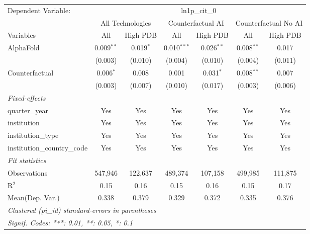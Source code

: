 \begingroup
\centering
\begin{tabular}{lcccccc}
   \tabularnewline \midrule \midrule
   Dependent Variable: & \multicolumn{6}{c}{ln1p\_cit\_0}\\
 & \multicolumn{2}{c}{All Technologies} & \multicolumn{2}{c}{Counterfactual AI} & \multicolumn{2}{c}{Counterfactual No AI} \\
\cmidrule(lr){1-1}\cmidrule(lr){2-3} \cmidrule(lr){4-5} \cmidrule(lr){6-7}
Variables & \multicolumn{1}{c}{All} & \multicolumn{1}{c}{High PDB} & \multicolumn{1}{c}{All} & \multicolumn{1}{c}{High PDB} & \multicolumn{1}{c}{All} & \multicolumn{1}{c}{High PDB} \\
\cmidrule(lr){1-1}\cmidrule(lr){2-2} \cmidrule(lr){3-3} \cmidrule(lr){4-4} \cmidrule(lr){5-5} \cmidrule(lr){6-6} \cmidrule(lr){7-7}
   AlphaFold                    & 0.009$^{**}$ & 0.019$^{*}$ & 0.010$^{***}$ & 0.026$^{**}$ & 0.008$^{**}$ & 0.017\\   
                                & (0.003)      & (0.010)     & (0.004)       & (0.010)      & (0.004)      & (0.011)\\   
   Counterfactual               & 0.006$^{*}$  & 0.008       & 0.001         & 0.031$^{*}$  & 0.008$^{**}$ & 0.007\\   
                                & (0.003)      & (0.007)     & (0.010)       & (0.017)      & (0.003)      & (0.006)\\   
   \midrule
   \emph{Fixed-effects}\\
   quarter\_year                & Yes          & Yes         & Yes           & Yes          & Yes          & Yes\\  
   institution                  & Yes          & Yes         & Yes           & Yes          & Yes          & Yes\\  
   institution\_type            & Yes          & Yes         & Yes           & Yes          & Yes          & Yes\\  
   institution\_country\_code   & Yes          & Yes         & Yes           & Yes          & Yes          & Yes\\  
   \midrule
   \emph{Fit statistics}\\
   Observations                 & 547,946      & 122,637     & 489,374       & 107,158      & 499,985      & 111,875\\  
   R$^2$                        & 0.15         & 0.16        & 0.15          & 0.16         & 0.15         & 0.17\\  
Mean(Dep. Var.) & 0.338 & 0.379 & 0.329 & 0.372 & 0.335 & 0.376 \\
   \midrule \midrule
   \multicolumn{7}{l}{\emph{Clustered (pi\_id) standard-errors in parentheses}}\\
   \multicolumn{7}{l}{\emph{Signif. Codes: ***: 0.01, **: 0.05, *: 0.1}}\\
\end{tabular}
\par\endgroup
